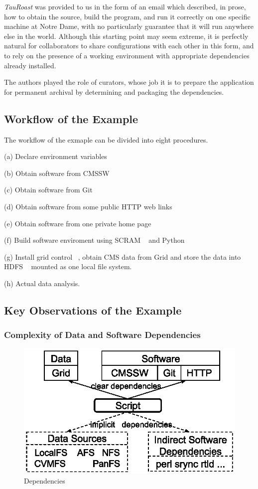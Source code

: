 \documentclass{acm_proc_article-sp}
\begin{document}
\emph{TauRoast} was provided to us in the form of an
email which described, in prose, how to obtain the source,
build the program, and run it correctly on one specific
machine at Notre Dame, with no particularly guarantee that
it will run anywhere else in the world.
Although this starting point may seem extreme, it is
perfectly natural for collaborators to share configurations
with each other in this form, and to rely on the presence
of a working environment with appropriate dependencies already
installed.

The authors played the role of curators, whose job it is to prepare the application for permanent archival by determining and packaging the dependencies.

\subsection{Workflow of the Example}

The workflow of the exmaple can be divided into eight procedures.

(a) Declare environment variables

(b) Obtain software from CMSSW

(c) Obtain software from Git

(d) Obtain software from some public HTTP web links

(e) Obtain software from one private home page

(f) Build software enviroment using SCRAM ~\cite{rabbertz2004cms} and Python

(g) Install grid control ~\cite{holtman2001cms}, obtain CMS data from Grid and store the data into HDFS ~\cite{borthakur2008hdfs} mounted as one local file system.

(h) Actual data analysis.

\subsection{Key Observations of the Example}

\subsubsection{Complexity of Data and Software Dependencies}

\begin{figure}[t]
\centering
\includegraphics[width=.8\columnwidth]{dependencies.eps}
\caption{Dependencies}
\label{fig:dependencies}
\end{figure}
\end{document}
